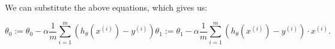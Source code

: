 \documentclass[letter]{article}
\begin{document}
                 
                
    We can substitute the above equations, which gives us:
       \begin{center}
            \[
            \theta_0 := \theta_0 - \alpha \frac{1}{m} \sum_{i=1}^{m} (h_\theta(x^{(i)}) - y^{(i)} )

            \theta_1 := \theta_1 - \alpha \frac{1}{m} \sum_{i=1}^{m} (h_\theta(x^{(i)}) - y^{(i)} ) \cdot x^{(i)}

            .\]  

       
       \end{center} 
    
\end{document}
